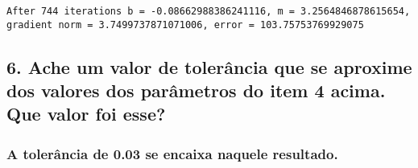 \documentclass[11pt]{article}
\begin{document}
    
    
    \begin{Verbatim}[commandchars=\\\{\}]
After 744 iterations b = -0.08662988386241116, m = 3.2564846878615654, gradient norm = 3.7499737871071006, error = 103.75753769929075

    \end{Verbatim}

    \subsection{6. Ache um valor de tolerância que se aproxime dos valores
dos parâmetros do item 4 acima. Que valor foi
esse?}\label{ache-um-valor-de-toleruxe2ncia-que-se-aproxime-dos-valores-dos-paruxe2metros-do-item-4-acima.-que-valor-foi-esse}

\subsubsection{A tolerância de 0.03 se encaixa naquele
resultado.}\label{a-toleruxe2ncia-de-0.03-se-encaixa-naquele-resultado.}
\end{document}
